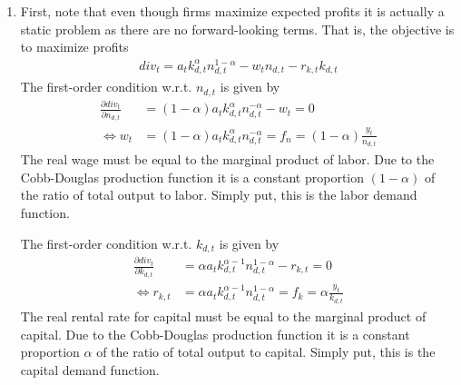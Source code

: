 \begin{enumerate}
(I) and (III) in (IV) yields
\begin{align*}
\underbrace{\gamma c_t^{-1}}_{U_{c,t}} &= \beta E_t \underbrace{\gamma c_{t+1}^{-1}}_{U_{c,t+1}}\left(1 - \delta + r_{k,t+1}\right)
\end{align*}
This is the Euler equation of \textbf{intertemporal optimality}. It reflects the trade-off between consumption and savings.
If the household saves a (marginal) unit of consumption, i.e. invests this into the capital stock,
  she can consume $(1-\delta+r_{k,t+1})$ units in the following period.
The marginal utility of consuming a unit today is equal to $U_{c,t}$,
  whereas consuming tomorrow has expected utility equal to $E_t(U_{c,t+1})$.
Discounting expected marginal utility with $\beta$, an optimum is characterized by a situation
  in which the household must be indifferent between both choices.

(I) in (II) yields:
\begin{align*}
w_t = -\frac{\frac{-\psi}{1-n_t}}{\gamma c_t^{-1}} \equiv - \frac{U_{n,t}}{U_{c,t}}
\end{align*}
This equation reflects \textbf{intratemporal optimality}; in other words, the labor supply function.
According to the equation, the real wage must be equal to the marginal rate of substitution between consumption and leisure.

\item First, note that even though firms maximize expected profits it is actually a static problem as there are no forward-looking terms.
That is, the objective is to maximize profits
\begin{align*}
{div}_t = a_t k_{d,t}^\alpha n_{d,t}^{1-\alpha} - w_t n_{d,t} - r_{k,t} k_{d,t}
\end{align*}
The first-order condition w.r.t. $n_{d,t}$ is given by
\begin{align*}
\frac{\partial {div}_t}{\partial n_{d,t}} &= (1-\alpha) a_t k_{d,t}^\alpha n_{d,t}^{-\alpha} - w_t = 0
\\
\Leftrightarrow w_t &= (1-\alpha) a_t k_{d,t}^\alpha n_{d,t}^{-\alpha} = f_n = (1-\alpha) \frac{y_t}{n_{d,t}}
\end{align*}
The real wage must be equal to the marginal product of labor.
Due to the Cobb-Douglas production function it is a constant proportion $(1-\alpha)$ of the ratio of total output to labor.
Simply put, this is the labor demand function.
				
The first-order condition w.r.t. $k_{d,t}$ is given by
\begin{align*}
\frac{\partial {div}_t}{\partial k_{d,t}} &= \alpha a_t k_{d,t}^{\alpha-1} n_{d,t}^{1-\alpha} - r_{k,t} = 0
\\
\Leftrightarrow r_{k,t} &= \alpha a_t k_{d,t}^{\alpha-1} n_{d,t}^{1-\alpha} = f_k = \alpha \frac{y_t}{k_{d,t}}
\end{align*}
The real rental rate for capital must be equal to the marginal product of capital.
Due to the Cobb-Douglas production function it is a constant proportion $\alpha$ of the ratio of total output to capital.
Simply put, this is the capital demand function.


\end{enumerate}
